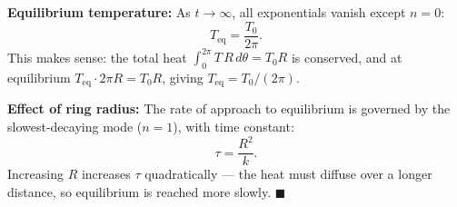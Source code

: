 \documentclass[12pt]{article}
\begin{document}
\textbf{Equilibrium temperature:} As $t \to \infty$, all exponentials vanish except $n = 0$:
\[
T_{\text{eq}} = \frac{T_0}{2\pi}.
\]
This makes sense: the total heat $\int_0^{2\pi}T\,R\,d\theta = T_0 R$ is conserved, and at equilibrium $T_\text{eq}\cdot 2\pi R = T_0 R$, giving $T_\text{eq} = T_0/(2\pi)$.

\textbf{Effect of ring radius:} The rate of approach to equilibrium is governed by the slowest-decaying mode ($n = 1$), with time constant:
\[
\tau = \frac{R^2}{k}.
\]
Increasing $R$ increases $\tau$ quadratically --- the heat must diffuse over a longer distance, so equilibrium is reached more slowly. $\blacksquare$
\end{document}
